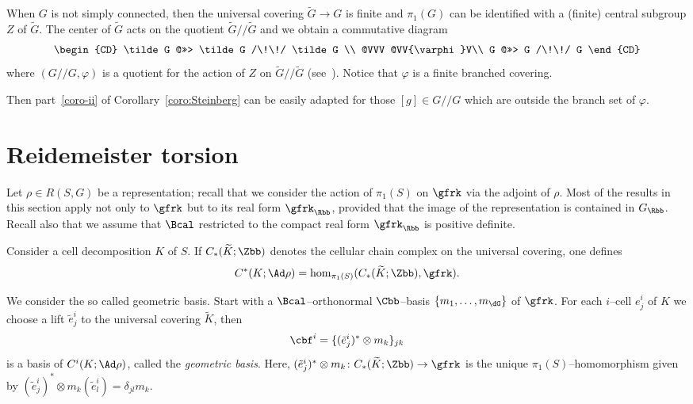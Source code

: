 \begin{rema}\label{rem:Gnonsimplyconnected}
When $G$ is not simply connected, then the universal covering $\tilde G\to G$ is finite and $\pi_1(G)$ can be identified with a (finite) central subgroup $Z$ of $\tilde G$. The center of $\tilde G$ acts on the quotient $\tilde G /\!\!/ \tilde G$ and we obtain a commutative diagram
\[
\begin{CD}
\tilde G @>>> \tilde G /\!\!/ \tilde G \\
@VVV @VV{\varphi}V\\
G @>>> G /\!\!/ G
\end{CD}
\]
where $(G/\!\!/ G,\varphi)$ is a quotient for the action of $Z$ on $\tilde G /\!\!/ \tilde G$ (see~\cite[Lemma~2.5]{Popov}). Notice that $\varphi$ is a finite branched covering.

Then part~\eqref{coro-ii} of Corollary~\ref{coro:Steinberg} can be easily adapted for those $[g]\in G/\!\!/ G$ which are outside the branch set of $\varphi$.
\end{rema}



\section{Reidemeister torsion}\label{Section:RT}

Let $\rho\in R(S,G)$ be a representation; recall that we consider the action of $\pi_1(S)$ on $\gfrk$ via the adjoint of $\rho$. Most of the results in this section apply not only to $\gfrk$ but to its real form $\gfrk_{\Rbb}$, provided that the image of the representation is contained in $G_\Rbb$. Recall also that we assume that $\Bcal$ restricted to the compact real form $\gfrk_{\Rbb}$ is positive definite.

Consider a cell decomposition $K$ of $S$. If $C_*(\widetilde K;\Zbb)$ denotes the cellular chain complex on the universal covering, one defines
\begin{equation}\label{eqn:chaincplx}
C^*(K;\Ad\rho)=\hom_{\pi_1(S)}(C_*(\widetilde K;\Zbb), \gfrk).
\end{equation}



We consider the so called geometric basis. Start with a $\Bcal$--orthonormal $\Cbb$--basis $\{m_1,\dots,m_{\dG}\}$ of $\gfrk$. For each $i$--cell $e^i_j$ of $K$ we choose a lift $\tilde e^i_j$ to the universal covering $\widetilde{K}$, then
\[
\cbf^i=\{ (\tilde e^i_j)^*\otimes m_k \}_{jk}
\]
is a basis of $ C^i(K;\Ad\rho)$, called the \emph{geometric basis}. Here, $(\tilde e^i_j)^*\otimes m_k\colon C_*(\widetilde K;\Zbb)\to \gfrk$ is the unique $\pi_1(S)$--homomorphism given by $(\tilde e^i_j)^*\otimes m_k (\tilde e^i_l) =\delta_{jl} m_k$.

